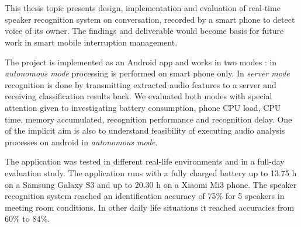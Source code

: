 \chapter{\abstractname}

This thesis topic presents design, implementation and evaluation of real-time speaker recognition system on conversation, recorded by a smart phone to detect voice of its owner. The findings and deliverable would become basis for future work in smart mobile interruption management.

The project is implemented as an Android app and works in two modes : in \textit{autonomous mode} processing is performed on smart phone only. In \textit{server mode} recognition is done by transmitting extracted audio features to a server and receiving classification results back. We evaluated both modes with special attention given to investigating battery consumption, phone CPU load, CPU time, memory accumulated, recognition performance and recognition delay. One of the implicit aim is also to understand feasibility of executing audio analysis processes on android in \textit{autonomous mode}. 

The application was tested in different real-life environments and in a full-day evaluation study. The application runs with a fully charged battery up to 13.75 h on a Samsung Galaxy S3 and up to 20.30 h on a Xiaomi Mi3 phone. The speaker recognition system reached an identification accuracy of 75\% for 5 speakers in meeting room conditions. In other daily life situations it reached accuracies from 60\% to 84\%.

